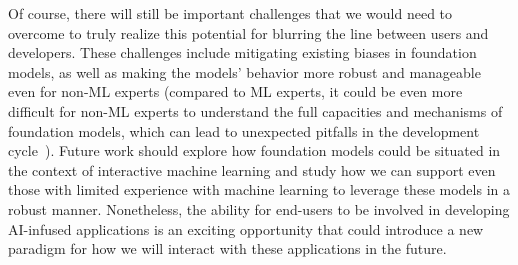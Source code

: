 Of course, there will still be important challenges that we would need to overcome to truly realize this potential for blurring the line between users and developers. These challenges include mitigating existing biases in foundation models, as well as making the models' behavior more robust and manageable even for non-ML experts (compared to ML experts, it could be even more difficult for non-ML experts to understand the full capacities and mechanisms of foundation models, which can lead to unexpected pitfalls in the development cycle~\citep{QianYang2018}). Future work should explore how foundation models could be situated in the context of interactive machine learning and study how we can support even those with limited experience with machine learning to leverage these models in a robust manner. Nonetheless, the ability for end-users to be involved in developing AI-infused applications is an exciting opportunity that could introduce a new paradigm for how we will interact with these applications in the future. 
